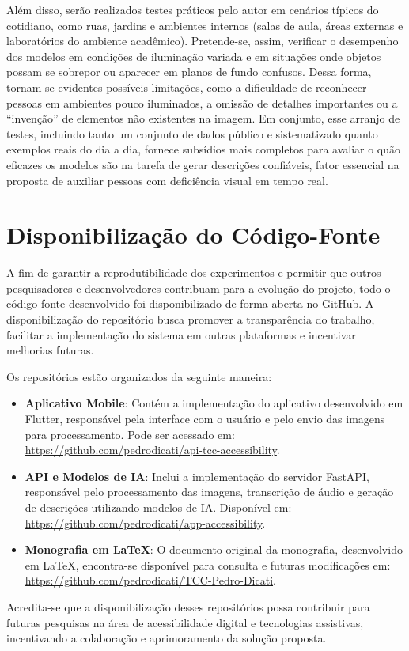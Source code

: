 Além disso, serão realizados testes práticos pelo autor em cenários típicos do cotidiano, como ruas, jardins e ambientes internos (salas de aula, áreas externas e laboratórios do ambiente acadêmico). Pretende-se, assim, verificar o desempenho dos modelos em condições de iluminação variada e em situações onde objetos possam se sobrepor ou aparecer em planos de fundo confusos. Dessa forma, tornam-se evidentes possíveis limitações, como a dificuldade de reconhecer pessoas em ambientes pouco iluminados, a omissão de detalhes importantes ou a “invenção” de elementos não existentes na imagem. Em conjunto, esse arranjo de testes, incluindo tanto um conjunto de dados público e sistematizado quanto exemplos reais do dia a dia, fornece subsídios mais completos para avaliar o quão eficazes os modelos são na tarefa de gerar descrições confiáveis, fator essencial na proposta de auxiliar pessoas com deficiência visual em tempo real.

\section{Disponibilização do Código-Fonte}

A fim de garantir a reprodutibilidade dos experimentos e permitir que outros pesquisadores e desenvolvedores contribuam para a evolução do projeto, todo o código-fonte desenvolvido foi disponibilizado de forma aberta no GitHub. A disponibilização do repositório busca promover a transparência do trabalho, facilitar a implementação do sistema em outras plataformas e incentivar melhorias futuras.

Os repositórios estão organizados da seguinte maneira:

\begin{itemize}
    \item \textbf{Aplicativo Mobile}: Contém a implementação do aplicativo desenvolvido em Flutter, responsável pela interface com o usuário e pelo envio das imagens para processamento. Pode ser acessado em: \url{https://github.com/pedrodicati/api-tcc-accessibility}.
    
    \item \textbf{API e Modelos de IA}: Inclui a implementação do servidor FastAPI, responsável pelo processamento das imagens, transcrição de áudio e geração de descrições utilizando modelos de IA. Disponível em: \url{https://github.com/pedrodicati/app-accessibility}.
    
    \item \textbf{Monografia em LaTeX}: O documento original da monografia, desenvolvido em LaTeX, encontra-se disponível para consulta e futuras modificações em: \url{https://github.com/pedrodicati/TCC-Pedro-Dicati}.
\end{itemize}

Acredita-se que a disponibilização desses repositórios possa contribuir para futuras pesquisas na área de acessibilidade digital e tecnologias assistivas, incentivando a colaboração e aprimoramento da solução proposta.

